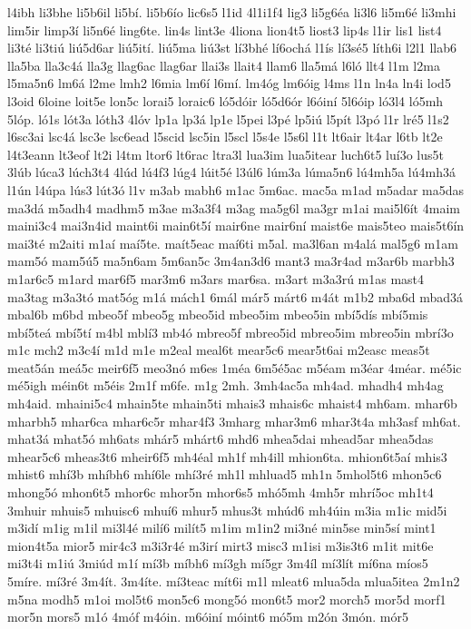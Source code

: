 {l4ibh
li3bhe
li5b6il
li5bí.
li5b6ío
lic6s5
l1id
4l1i1f4
lig3
li5g6éa
li3l6
li5m6é
li3mhi
lim5ir
limp3í
li5n6é
ling6te.
lin4s
lint3e
4liona
lion4t5
liost3
lip4s
l1ir
lis1
list4
li3té
li3tiú
liú5d6ar
liú5ití.
liú5ma
liú3st
lí3bhé
lí6ochá
l1ís
lí3sé5
líth6i
l2l1
llab6
lla5ba
lla3c4á
lla3g
llag6ac
llag6ar
llai3s
llait4
llam6
lla5má
l6ló
llt4
l1m
l2ma
l5ma5n6
lm6á
l2me
lmh2
l6mia
lm6í
l6mí.
lm4óg
lm6óig
l4ms
l1n
ln4a
ln4i
lod5
l3oid
6loine
loit5e
lon5c
lorai5
loraic6
ló5dóir
ló5d6ór
l6óiní
5l6óip
ló3l4
ló5mh
5lóp.
ló1s
lót3a
lóth3
4lóv
lp1a
lp3á
lp1e
l5pei
l3pé
lp5iú
l5pít
l3pó
l1r
lré5
l1s2
l6sc3ai
lsc4á
lsc3e
lsc6ead
l5scid
lsc5in
l5scl
l5s4e
l5s6l
l1t
lt6air
lt4ar
l6tb
lt2e
l4t3eann
lt3eof
lt2i
l4tm
ltor6
lt6rac
ltra3l
lua3im
lua5itear
luch6t5
luí3o
lus5t
3lúb
lúca3
lúch3t4
4lúd
lú4f3
lúg4
lúit5é
l3úl6
lúm3a
lúma5n6
lú4mh5a
lú4mh3á
l1ún
l4úpa
lús3
lút3ó
l1v
m3ab
mabh6
m1ac
5m6ac.
mac5a
m1ad
m5adar
ma5das
ma3dá
m5adh4
madhm5
m3ae
m3a3f4
m3ag
ma5g6l
ma3gr
m1ai
mai5l6ít
4maim
maini3c4
mai3n4id
maint6i
main6t5í
mair6ne
mair6ní
maist6e
mais5teo
mais5t6ín
mai3té
m2aiti
m1aí
maí5te.
maít5eac
maí6ti
m5al.
ma3l6an
m4alá
mal5g6
m1am
mam5ó
mam5ú5
ma5n6am
5m6an5c
3m4an3d6
mant3
ma3r4ad
m3ar6b
marbh3
m1ar6c5
m1ard
mar6f5
mar3m6
m3ars
mar6sa.
m3art
m3a3rú
m1as
mast4
ma3tag
m3a3tó
mat5óg
m1á
mách1
6mál
már5
márt6
m4át
m1b2
mba6d
mbad3á
mbal6b
m6bd
mbeo5f
mbeo5g
mbeo5id
mbeo5im
mbeo5in
mbí5dís
mbí5mis
mbí5teá
mbí5tí
m4bl
mblí3
mb4ó
mbreo5f
mbreo5id
mbreo5im
mbreo5in
mbrí3o
m1c
mch2
m3c4í
m1d
m1e
m2eal
meal6t
mear5c6
mear5t6ai
m2easc
meas5t
meat5án
meá5c
meir6f5
meo3nó
m6es
1méa
6m5é5ac
m5éam
m3éar
4méar.
mé5ic
mé5igh
méin6t
m5éis
2m1f
m6fe.
m1g
2mh.
3mh4ac5a
mh4ad.
mhadh4
mh4ag
mh4aid.
mhaini5c4
mhain5te
mhain5ti
mhais3
mhais6c
mhaist4
mh6am.
mhar6b
mharbh5
mhar6ca
mhar6c5r
mhar4f3
3mharg
mhar3m6
mhar3t4a
mh3asf
mh6at.
mhat3á
mhat5ó
mh6ats
mhár5
mhárt6
mhd6
mhea5dai
mhead5ar
mhea5das
mhear5c6
mheas3t6
mheir6f5
mh4éal
mh1f
mh4ill
mhion6ta.
mhion6t5aí
mhis3
mhist6
mhí3b
mhíbh6
mhí6le
mhí3ré
mh1l
mhluad5
mh1n
5mhol5t6
mhon5c6
mhong5ó
mhon6t5
mhor6c
mhor5n
mhor6s5
mhó5mh
4mh5r
mhrí5oc
mh1t4
3mhuir
mhuis5
mhuisc6
mhuí6
mhur5
mhus3t
mhúd6
mh4úin
m3ia
m1ic
mid5i
m3idí
m1ig
m1il
mi3l4é
milí6
milít5
m1im
m1in2
mi3né
min5se
min5sí
mint1
mion4t5a
mior5
mir4c3
m3i3r4é
m3irí
mirt3
misc3
m1isi
m3is3t6
m1it
mit6e
mi3t4i
m1iú
3miúd
m1í
mí3b
míbh6
mí3gh
mí5gr
3m4íl
mí3lít
mí6na
míos5
5míre.
mí3ré
3m4ít.
3m4íte.
mí3teac
mít6i
m1l
mleat6
mlua5da
mlua5itea
2m1n2
m5na
modh5
m1oi
mol5t6
mon5c6
mong5ó
mon6t5
mor2
morch5
mor5d
morf1
mor5n
mors5
m1ó
4móf
m4óin.
m6óiní
móint6
mó5m
m2ón
3món.
mór5
}
